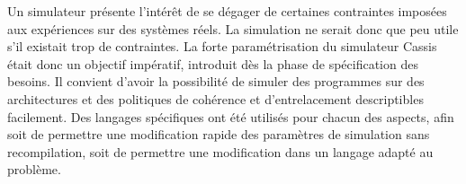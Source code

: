 Un simulateur présente l'intérêt de se dégager de certaines contraintes imposées aux expériences sur des systèmes réels. La simulation ne serait donc que peu utile s'il existait trop de contraintes. La forte paramétrisation du simulateur \textsf{Cassis} était donc un objectif impératif, introduit dès la phase de spécification des besoins. Il convient d'avoir la possibilité de simuler des programmes sur des architectures et des politiques de cohérence et d'entrelacement descriptibles facilement. Des langages spécifiques ont été utilisés pour chacun des aspects, afin soit de permettre une modification rapide des paramètres de simulation sans recompilation, soit de permettre une modification dans un langage adapté au problème.




